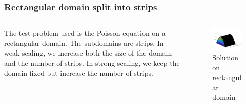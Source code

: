 \documentclass{beamer}
\begin{document}
\begin{frame}
\frametitle{Rectangular domain split into strips}

\begin{columns}
	\begin{column}{0.5\textwidth}
		The test problem used is the Poisson equation on a rectangular domain.
		The subdomains are strips.
		In weak scaling, we increase both the size of the domain and the number of strips.
		In strong scaling, we keep the domain fixed but increase the number of strips.
	\end{column}
	\begin{column}{0.5\textwidth}
		\begin{figure}
			\includegraphics[width=\textwidth]{FIG/MTLB_strips.png}
			\caption{Solution on rectangular domain}
		\end{figure}
	\end{column}
\end{columns}

\end{frame}
\end{document}
